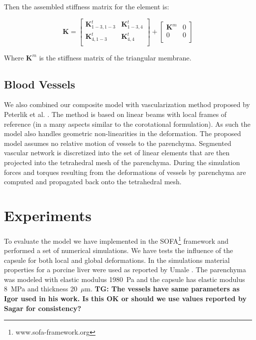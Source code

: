 \documentclass{llncs}
\newcommand{\TG}[1]{{\color{blue}\textbf{TG: #1}}}
\newcommand{\Mat}[1]{\mathbf{#1}}
\begin{document}
Then the assembled stiffness matrix for the element is:

\begin{equation}
  \Mat{K} = \left[\begin{array}{c|c}
      \Mat{K}^t_{1-3,1-3} & \Mat{K}^t_{1-3,4} \\
      \hline
      \Mat{K}^t_{4,1-3} & \Mat{K}^t_{4,4} \\
  \end{array}\right]
  +
  \left[\begin{array}{c|c}
      \Mat{K}^m & 0 \\
      \hline
      0 & 0 \\
  \end{array}\right]
\end{equation}

Where $\Mat{K}^m$ is the stiffness matrix of the triangular membrane.


\subsection{Blood Vessels} %

We also combined our composite model with vascularization method proposed
by Peterlik et al. \cite{Peterlik2012}. The method is based on linear beams
with local frames of reference (in a many aspects similar to the
corotational formulation). As such the model also handles geometric
non-linearities in the deformation. The proposed model assumes no relative
motion of vessels to the parenchyma. Segmented vascular network is
discretized into the set of linear elements that are then projected into
the tetrahedral mesh of the parenchyma. During the simulation forces and
torques resulting from the deformations of vessels by parenchyma are
computed and propagated back onto the tetrahedral mesh.



\section{Experiments} %

To evaluate the model we have implemented in the
SOFA\footnote{www.sofa-framework.org} framework and performed a set of
numerical simulations. We have tests the influence of the capsule for both
local and global deformations. In the simulations material properties for a
porcine liver were used as reported by Umale \cite{Umale2013}. The
parenchyma was modeled with elastic modulus 1980~Pa and the capsule has
elastic modulus 8~MPa and thickness 20~$\mu$m.
\TG{The vessels have same parameters as Igor used in his work. Is this OK
or should we use values reported by Sagar for consistency?}
\end{document}
